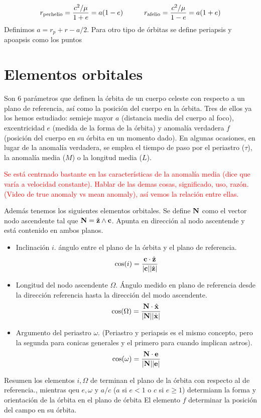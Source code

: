 \begin{equation}
    r_{\text{perhelio}} = \frac{c^2/\mu}{1+e} = a(1-e) \quad \quad \quad r_{\text{afelio}} = \frac{c^2/\mu}{1-e} = a(1+e)
\end{equation}
Definimos $a=r_p+r-a/2$. Para otro tipo de órbitas se define periapsis y apoapsis como los puntos 

\section{Elementos orbitales}

Son 6 parámetros que definen la órbita de un cuerpo celeste con respecto a un plano de referencia, así como la posición del cuerpo en la órbita. Tres de ellos ya los hemos estudiado: semieje mayor $a$ (distancia media del cuerpo al foco), excentricidad $e$ (medida de la forma de la órbita) y anomalía verdadera $f$ (posición del cuerpo en su órbita en un momento dado). En algunas ocasiones, en lugar de la anomalía verdadera, se emplea el tiempo de paso por el periastro ($\tau$), la anomalía media ($M$) o la longitud media ($L$).

\begin{Anotacion}
    \textcolor{red}{ Se está centrnado bastante en las características de la anomalía media (dice que varía a velocidad constante). Hablar de las demas cosas, significado, uso, razón. (Video de true anomaly vs mean anomaly), así vemos la relación entre ellas. }
\end{Anotacion}

Además tenemos los siguientes elementos orbitales. Se define $\mathbf{N}$ como el vector nodo ascendente tal que $\mathbf{N}=\hat{\mathbf{z}} \wedge \mathbf{c}$. Apunta en dirección al nodo ascentende y está contenido en ambos planos. 

\begin{itemize}
    \item Inclinación $i$. ángulo entre el plano de la órbita y el plano de referencia.
    \begin{equation}
        \cos (i) = \frac{\mathbf{c} \cdot \hat{\mathbf{z}}}{|\mathbf{c}||\hat{\mathbf{z}}|}
    \end{equation}
    \item Longitud del nodo ascendente $\Omega$. Ángulo medido en plano de referencia desde la dirección referencia hasta la dirección del modo ascendente.
    \begin{equation}
        \cos (\Omega) = \frac{\mathbf{N} \cdot \hat{\mathbf{x}}}{|\mathbf{N}||\hat{\mathbf{x}}|}
    \end{equation}
    \item Argumento del periastro $\omega$. (Periastro y periapsis es el mismo concepto, pero la segunda para conicas generales y el primero para cuando implican astros). 
    \begin{equation}
        \cos (\omega) = \frac{\mathbf{N}\cdot \mathbf{e}}{|\mathbf{N}||\mathbf{e}|}
    \end{equation}
\end{itemize}
Resumen los elementos $i,\Omega$ de terminan el plano de la órbita con respecto al de referencia., mientras qeu $e,\omega$ y $a/c$ ($a$ si $e<1$ o $c$ si $e\geq1$) determiann la forma y orientación de la órbita en el plano de órbita  El elemento $f$ determinar la posición del campo en su órbita.


